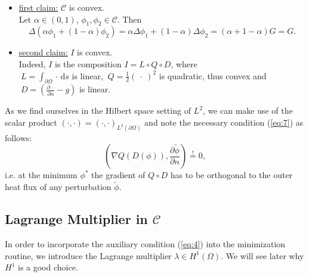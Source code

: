\begin{itemize}
	\item \underline{first claim:} $\mathcal C$ is convex.\\
	Let $\alpha\in(0,1)$, $\phi_1,\phi_2\in\mathcal C$. Then
	\begin{equation*}
		\Delta \left(\alpha\phi_1 + (1-\alpha)\phi_2\right)
		= \alpha \Delta \phi_1 + (1-\alpha)\Delta\phi_2
		= (\alpha + 1 - \alpha)G = G.
	\end{equation*}
	\item \underline{second claim:} $I$ is convex.\\
	Indeed, $I$ is the composition $I = L\circ Q\circ D$, where\\
	$\:L=\int_{\partial\Omega}\cdot\,\mathrm ds$ is linear, $\:Q=\frac{1}{2}(\:\cdot\:)^2$ is quadratic, thus convex and $\:D=(\frac{\partial\,\cdot}{\partial n}-g)$ is linear.
\end{itemize}
As we find ourselves in the Hilbert space setting of $L^2$, we can make use of the scalar product $\left(\cdot,\cdot\right) = \left(\cdot,\cdot\right)_{L^2(\partial \Omega)}$ and note the necessary condition (\ref{eq:7}) as follows:
\begin{equation}\label{eq:8}
	\left(\nabla Q(D(\phi)),\frac{\partial \widetilde{\phi}}{\partial n}\right)
	\overset{!}{=}0,
\end{equation}
i.e. at the minimum $\phi^*$ the gradient of $Q\circ D$ has to be orthogonal to the outer heat flux of any perturbation $\widetilde{\phi}$.

\subsection{Lagrange Multiplier in $\mathcal C$}
In order to incorporate the auxiliary condition (\ref{eq:4}) into the minimization routine, we introduce the Lagrange multiplier $\lambda\in H^1(\Omega)$. We will see later why $H^1$ is a good choice.

